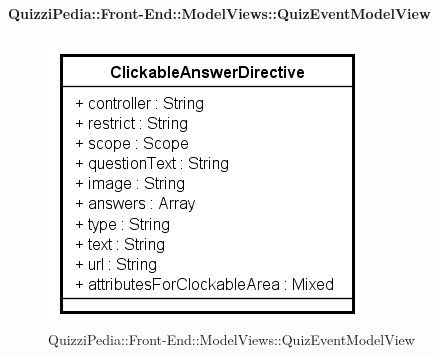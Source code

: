 \paragraph{QuizziPedia::Front-End::ModelViews::QuizEventModelView}
							
							\label{QuizziPedia::Front-End::ModelViews::QuizEventModelView}
							
							\begin{figure}[ht]
								\centering
								\includegraphics[scale=0.5,keepaspectratio]{UML/Classi/Front-End/QuizziPedia_Front-end_Templates_ClickableAnswerTemplate.png}
								\caption{QuizziPedia::Front-End::ModelViews::QuizEventModelView}
							\end{figure} \FloatBarrier
							
